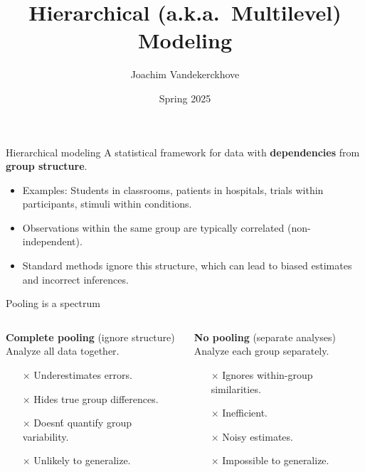 \documentclass[aspectratio=169]{beamer}
\title{Hierarchical (a.k.a.~Multilevel) Modeling}
\author{Joachim Vandekerckhove}
\date{Spring 2025}
\begin{document}
\maketitle

\begin{frame}{Hierarchical modeling}
    A statistical framework for data with \textbf{dependencies} from \textbf{group structure}.
    \pause
    \begin{itemize}
        \item Examples: Students in classrooms, patients in hospitals, trials within participants, stimuli within conditions.
        \item Observations within the same group are typically correlated (non-independent).
        \item Standard methods ignore this structure, which can lead to biased estimates and incorrect inferences.
    \end{itemize}
\end{frame}

\begin{frame}{Pooling is a spectrum}
    \begin{columns}[T] %
        \begin{column}{0.5\textwidth}
            \textbf{Complete pooling} (ignore structure)\\
            \small Analyze all data together.
            \begin{itemize}
                \item[$\times$] Underestimates errors.
                \item[$\times$] Hides true group differences.
                \item[$\times$] Doesn\'t quantify group variability.
                \item[$\times$] Unlikely to generalize.
            \end{itemize}
        \end{column}
        \begin{column}{0.5\textwidth}
            \textbf{No pooling} (separate analyses)\\
            \small Analyze each group separately.
            \begin{itemize}
                \item[$\times$] Ignores within-group similarities.
                \item[$\times$] Inefficient.
                \item[$\times$] Noisy estimates.
                \item[$\times$] Impossible to generalize.
            \end{itemize}
        \end{column}
    \end{columns}
\end{frame}
\end{document}
